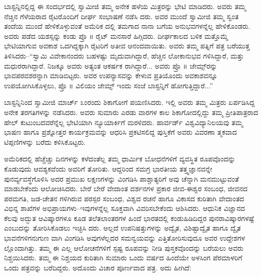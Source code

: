 ಬಾಸ್ಟನ್ನಿನಲ್ಲಿದ್ದ ಈ ಸಂದರ್ಭದಲ್ಲಿ ಸ್ವಾಮೀಜಿ ತಮ್ಮ ಅನೇಕ ಹಳೆಯ ಮಿತ್ರರನ್ನು ಭೇಟಿ ಮಾಡಿದರು. ಅವರು ತಮ್ಮ ನೆಚ್ಚಿನ ಗೆಳೆಯರಾದ ರೈಟರೊಂದಿಗೆ ದೀರ್ಘ ಸಂಭಾಷಣೆ ನಡೆಸಿ ದರು. ಅವರ ಮುಂದೆ ಸ್ವಾಮೀಜಿ ತಮ್ಮ ಸ್ವಂತ ತಂದೆಯ ಮುಂದೆ ಹೇಳಿಕೊಳ್ಳುವಂತೆ ಅಮೆರಿಕ ದಲ್ಲಿ ತಮಗಾದ ನಾನಾ ಬಗೆಯ ಅನುಭವಗಳನ್ನೆಲ್ಲ ಹೇಳಿಕೊಂಡರು. ಅವರು ಪಡೆದ ಯಶಸ್ಸನ್ನು ಕಂಡು ಪ್ರೊ ॥ ರೈಟ್ ಮನಸಾರೆ ಹಿಗ್ಗಿದರು. ದೀರ್ಘಕಾಲದ ಬಳಿಕ ಮತ್ತೊಮ್ಮೆ ಭೇಟಿಯಾಗುವ ಅವಕಾಶ ಒದಗಿದ್ದಕ್ಕಾಗಿ ರೈಟರಿಗೆ ಅತೀವ ಆನಂದವಾಯಿತು. ಅವರು ತಮ್ಮ ಪತ್ನಿಗೆ ಪತ್ರ ಬರೆಯುತ್ತ ತಿಳಿಸಿದರು–“ಸ್ವಾಮಿ ವಿವೇಕಾನಂದರು ಬಹಳಷ್ಟು ಮೃದುವಾಗಿದ್ದಾರೆ, ಹೆಚ್ಚಿನ ಲೋಕಾನುಭವ ಗಳಿಸಿದ್ದಾರೆ, ಮತ್ತು ಮಧುರರಾಗಿದ್ದಾರೆ. ನಿಜಕ್ಕೂ ಅವರು ಅತ್ಯಂತ ಆಕರ್ಷಕ ರಾಗಿದ್ದಾರೆ... ಅವರು ಪ್ರೊ ॥ ಜೇಮ್ಸ್​ರನ್ನು ಭಾವಪರವಶರನ್ನಾಗಿ ಮಾಡಿಬಿಟ್ಟರು. ಅವರ ಉಪನ್ಯಾಸವನ್ನು ಕೇಳುವ ಪ್ರತಿಯೊಂದು ಅವಕಾಶವನ್ನೂ ಉಪಯೋಗಿಸಿಕೊಳ್ಳಲು, ಪ್ರೊ ॥ ವಿಲಿಯಂ ಜೇಮ್ಸ್ ಇಂದು ಸಂಜೆ ಬಾಸ್ಟನ್ನಿಗೆ ಹೋಗುತ್ತಿದ್ದಾರೆ...”

ಬಾಸ್ಟನ್ನಿನಿಂದ ಸ್ವಾಮೀಜಿ ಮಾರ್ಚ್ ೩ಂರಂದು ಶಿಕಾಗೋಗೆ ಪಯಣಿಸಿದರು. ಇಲ್ಲಿ ಅವರು ತಮ್ಮ ಮಿತ್ರರು ಏರ್ಪಡಿಸಿದ್ದ ಅನೇಕ ತರಗತಿಗಳನ್ನು ನಡೆಸಿದರು. ಅವರು ಸುಮಾರು ಎರಡು ವಾರಗಳ ಕಾಲ ಶಿಕಾಗೋದಲ್ಲಿದ್ದು ತಮ್ಮ ಪ್ರೀತಿಪಾತ್ರರಾದ ಹೇಲ್ ಕುಟುಂಬದವರೆನ್ನೆಲ್ಲ ಭೇಟಿಯಾಗಿ ನ್ಯೂಯಾರ್ಕಿಗೆ ಮರಳಿದರು. ಹಾರ್ವರ್ಡ್ ವಿಶ್ವವಿದ್ಯಾನಿಲಯವು ತಮ್ಮ ಭಾಷಣ ಹಾಗೂ ಪ್ರಶ್ನೋತ್ತರ ಕಾರ್ಯಕ್ರಮವನ್ನು ಆಧರಿಸಿ ಪ್ರಕಟಿಸಲಿದ್ದ ಪುಸ್ತಿಕೆಗೆ ಅವರು ವಿವರಣಾ ತ್ಮಕವಾದ ಟಿಪ್ಪಣಿಗಳನ್ನು ಬರೆದು ಕಳಿಸಿಕೊಟ್ಟರು.

ಅಮೆರಿಕದಲ್ಲಿ ಹೆಚ್ಚೆಚ್ಚು ದಿನಗಳನ್ನು ಕಳೆದಂತೆಲ್ಲ ತಮ್ಮ ಧಾರ್ಮಿಕ ಬೋಧನೆಗಳಿಗೆ ವ್ಯವಸ್ಥಿತ ರೂಪವೊಂದನ್ನು ಕೊಡುವುದು ಆವಶ್ಯಕವೆಂದು ಅವರಿಗೆ ತೋರಿತು. ಆದ್ದರಿಂದ ಸಮಗ್ರ ಭಾರತೀಯ ತತ್ತ್ವಜ್ಞಾನವನ್ನೇ ಪುನರ್ವ್ಯವಸ್ಥೆಗೊಳಿಸಿ ಅದರ ಪ್ರಮುಖ ಲಕ್ಷಣಗಳನ್ನು ವಿಂಗಡಿಸಿ ಪಾಶ್ಚಾತ್ಯರಿಗೆ ಅವು ಚೆನ್ನಾಗಿ ಮನಮುಟ್ಟುವಂತೆ ಮಾಡಬೇಕೆಂದು ಆಲೋಚಿಸಿದರು. ಬೇರೆ ಬೇರೆ ವೇದಾಂತ ದರ್ಶನಗಳ ಪ್ರಕಾರ ಜೀವ-ಈಶ್ವರ ಸಂಬಂಧ, ಜೀವನದ ಪರಮಗತಿ, ಜಡ-ಚೇತನ ಗಳಿಗಿರುವ ಪರಸ್ಪರ ಸಂಬಂಧ, ವಿಶ್ವದ ರಚನೆ ಹಾಗೂ ವಿಕಾಸದ ಕುರಿತಾಗಿ ವೇದಾಂತದ ವಿಭಿನ್ನ ಶಾಖೆಗಳ ಅಭಿಪ್ರಾಯಗಳು–ಇವುಗಳನ್ನೆಲ್ಲ ಸೂಕ್ತವಾಗಿ ವಿವರಿಸಬೇಕೆಂದು ಆಶಿಸಿದರು. ಆಧುನಿಕ ವಿಜ್ಞಾನದ ಕೆಲವು ಅದ್ಭುತ ಆವಿಷ್ಕಾರಗಳೂ ಕೂಡ ತಲೆತಲಾಂತರಗಳ ಹಿಂದೆ ಭಾರತದಲ್ಲಿ ಕಂಡುಹಿಡಿದಿದ್ದರ ಪುನರಾವಿಷ್ಕಾರಗಳಷ್ಟೆ ಎಂಬುದನ್ನು ತೋರಿಸಿಕೊಡಲು ಇಚ್ಛಿಸಿ ದರು. ಅಲ್ಲದೆ ಉಪನಿಷತ್ತುಗಳನ್ನು ಅದ್ವೈತ, ವಿಶಿಷ್ಟಾದ್ವೈತ ಹಾಗೂ ದ್ವೈತ ಭಾವನೆಗಳಿಗನುಗುಣ ವಾಗಿ ವಿಂಗಡಿಸಿ ಅವುಗಳೆಲ್ಲದರ ಸಮನ್ವಯವನ್ನು ಎತ್ತಿತೋರಿಸುವುದೂ ಅವರ ಉದ್ದೇಶಗಳ ಲ್ಲೊಂದಾಗಿತ್ತು. ತಮ್ಮ ಈ ಎಲ್ಲ ಆಲೋಚನೆಗಳಿಗೆ ಸ್ಪಷ್ಟ ರೂಪವನ್ನು ನೀಡಿ ಪುಸ್ತಕವೊಂದನ್ನು ಬರೆಯಲು ಅವರು ನಿಶ್ಚಯಿಸಿದರು. ತಮ್ಮ ಈ ನಿಶ್ಚಯದ ಕುರಿತಾಗಿ ಸುಮಾರು ಒಂದು ವರ್ಷದ ಹಿಂದೆಯೇ ಅಳಸಿಂಗ ಪೆರಮಾಳರಿಗೆ ಒಂದು ಪತ್ರವನ್ನು ಬರೆದಿದ್ದರು. ಅದೊಂದು ವಿಚಾರ ಪೂರ್ಣವಾದ ಪತ್ರ. ಅದು ಹೀಗಿದೆ:

